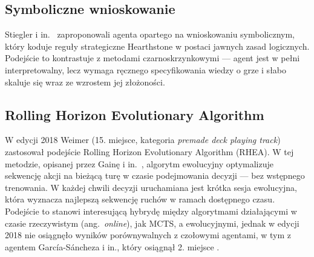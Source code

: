 \subsection{Symboliczne wnioskowanie}

Stiegler i in.~\cite{Stiegler2018} zaproponowali agenta opartego na wnioskowaniu symbolicznym, który koduje reguły strategiczne Hearthstone w postaci jawnych zasad logicznych. Podejście to kontrastuje z metodami czarnoskrzynkowymi --- agent jest w pełni interpretowalny, lecz wymaga ręcznego specyfikowania wiedzy o grze i słabo skaluje się wraz ze wzrostem jej złożoności.

\subsection{Rolling Horizon Evolutionary Algorithm}

W edycji 2018 Weimer (15. miejsce, kategoria \textit{premade deck playing track}) zastosował podejście Rolling Horizon Evolutionary Algorithm (RHEA). W tej metodzie, opisanej przez Gainę i in.~\cite{gaina2020}, algorytm ewolucyjny optymalizuje sekwencję akcji na bieżącą turę w czasie podejmowania decyzji --- bez wstępnego trenowania. W każdej chwili decyzji uruchamiana jest krótka sesja ewolucyjna, która wyznacza najlepszą sekwencję ruchów w ramach dostępnego czasu. Podejście to stanowi interesującą hybrydę między algorytmami działającymi w czasie rzeczywistym (ang.~\textit{online}), jak MCTS, a ewolucyjnymi, jednak w edycji 2018 nie osiągnęło wyników porównywalnych z czołowymi agentami, w tym z agentem García-Sáncheza i in., który osiągnął 2. miejsce \cite{hearthstone_competition, sanchez2020}.
